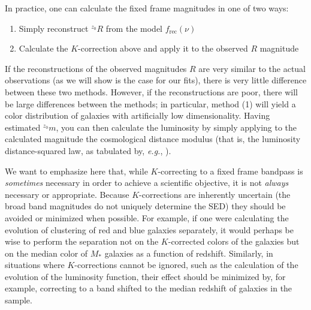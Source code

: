 \documentclass[10pt,preprint]{aastex}
\newcommand{\band}[2]{\ensuremath{^{{#1}}\!{#2}}}
\begin{document}

In practice, one can calculate the fixed frame magnitudes in one of
two ways:
\begin{enumerate}
\item Simply reconstruct $\band{z_0}{R}$ from the model
$f_{\mathrm{rec}}(\nu)$ 
\item Calculate the $K$-correction above and apply it to the observed
$R$ magnitude
\end{enumerate}
If the reconstructions of the observed magnitudes $R$ are very similar
to the actual observations (as we will show is the case for our fits),
there is very little difference between these two methods. However, if
the reconstructions are poor, there will be large differences between
the methods; in particular, method (1) will yield a color distribution
of galaxies with artificially low dimensionality. Having estimated
$\band{z_0}{m}$, you can then calculate the luminosity by simply
applying to the calculated magnitude the cosmological distance modulus
(that is, the luminosity distance-squared law, as tabulated by, {\it
e.g.}, \citealt{hogg99a}).

We want to emphasize here that, while $K$-correcting to a fixed frame
bandpass is {\it sometimes} necessary in order to achieve a scientific
objective, it is not {\it always} necessary or appropriate. Because
$K$-corrections are inherently uncertain (the broad band magnitudes do
not uniquely determine the SED) they should be avoided or minimized
when possible. For example, if one were calculating the evolution of
clustering of red and blue galaxies separately, it would perhaps be
wise to perform the separation not on the $K$-corrected colors of the
galaxies but on the median color of $M_\ast$ galaxies as a function of
redshift. Similarly, in situations where $K$-corrections cannot be
ignored, such as the calculation of the evolution of the luminosity
function, their effect should be minimized by, for example, correcting
to a band shifted to the median redshift of galaxies in the sample.
\end{document}

